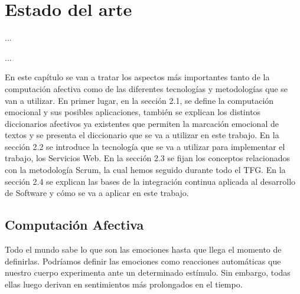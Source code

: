 %
%

\chapter{Estado del arte}

\begin{FraseCelebre}
\begin{Frase}
...
\end{Frase}
\begin{Fuente}
...
\end{Fuente}
\end{FraseCelebre}

\begin{resumen}
En este capítulo se van a tratar los aspectos más importantes tanto de la computación afectiva como de las diferentes tecnologías y metodologías que se van a utilizar.
En primer lugar, en la sección 2.1, se define la computación emocional y sus posibles aplicaciones, también se explican los distintos diccionarios afectivos ya existentes que permiten la marcación emocional de textos y se presenta el diccionario que se va a utilizar en este trabajo. En la sección 2.2 se introduce la tecnología que se va a utilizar para implementar el trabajo, los Servicios Web. En la sección 2.3 se fijan los conceptos relacionados con la metodología Scrum, la cual hemos seguido durante todo el TFG. En la sección 2.4 se explican las bases de la integración continua aplicada al desarrollo de Software y cómo se va a aplicar en este trabajo.

\end{resumen}


\section{Computación Afectiva}
\label{cap2:sec:computacion_afectiva}

Todo el mundo sabe lo que son las emociones hasta que llega el momento de definirlas. Podríamos definir las emociones como reacciones automáticas que nuestro cuerpo experimenta ante un determinado estímulo. Sin embargo, todas ellas luego derivan en sentimientos más prolongados en el tiempo.

